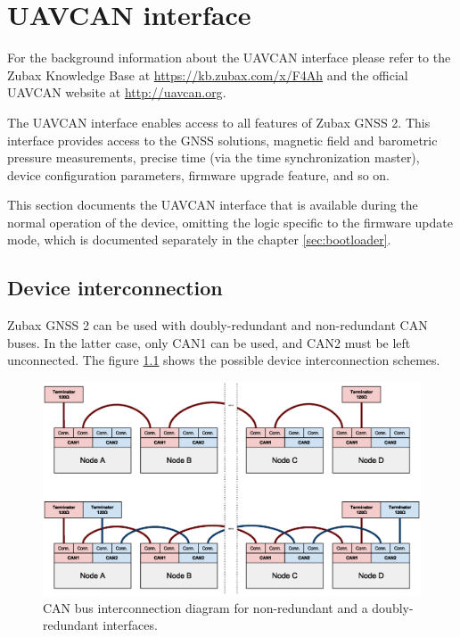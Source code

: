 \documentclass{zubaxdoc}
\begin{document}
\chapter{UAVCAN interface}

For the background information about the UAVCAN interface please refer to the Zubax Knowledge Base
at \url{https://kb.zubax.com/x/F4Ah} and the official UAVCAN website at \url{http://uavcan.org}.

The UAVCAN interface enables access to all features of Zubax GNSS 2.
This interface provides access to the GNSS solutions, magnetic field and barometric pressure measurements,
precise time (via the time synchronization master), device configuration parameters, firmware upgrade feature,
and so on.

This section documents the UAVCAN interface that is available during the normal operation of the device,
omitting the logic specific to the firmware update mode, which is documented separately in the chapter
\ref{sec:bootloader}.

\section{Device interconnection}

Zubax GNSS 2 can be used with doubly-redundant and non-redundant CAN buses.
In the latter case, only CAN1 can be used, and CAN2 must be left unconnected.
The figure \ref{can_daisy_chain} shows the possible device interconnection schemes.

\begin{figure}[hbt]
    \center
	\includegraphics[width=1\textwidth]{can_daisy_chain}
	\caption{CAN bus interconnection diagram for non-redundant and a doubly-redundant interfaces.
	\label{can_daisy_chain}}
\end{figure}
\end{document}
